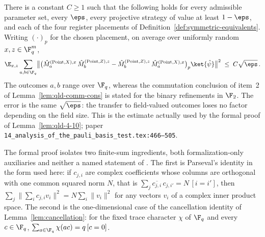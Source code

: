 \begin{lemma}
	\label{lem:expanded-point-field-commutation}
	\leanok
	There is a constant $C \geq 1$ such that the following holds for every
	admissible parameter set, every $\eps$, every projective strategy of value
	at least $1-\eps$, and each of the four register placements of
	Definition~\ref{def:symmetric-equivalents}. Writing $(\cdot)_p$ for the
	chosen placement, on average over uniformly random $x, z \in \F_q^m$,
	\[
		\E_{x,z} \sum_{a, b \in \F_q}
		\bigl\lVert
		\bigl(\hat{M}^{(\mathrm{Point},X),x}_{a}\,
		\hat{M}^{(\mathrm{Point},Z),z}_{b}
		- \hat{M}^{(\mathrm{Point},Z),z}_{b}\,
		\hat{M}^{(\mathrm{Point},X),x}_{a}\bigr)_{p}
		\ket{\hat{\psi}}
		\bigr\rVert^2
		\;\leq\; C\sqrt{\eps}\,.
	\]
	The outcomes $a, b$ range over $\F_q$, whereas the commutation conclusion
	of item~2 of Lemma~\ref{lem:qld-comm-cons} is stated for the binary
	refinements in $\F_2$. The error is the same $\sqrt{\eps}$: the transfer
	to field-valued outcomes loses no factor depending on the field size.
	This is the estimate actually used by the formal proof of
	Lemma~\ref{lem:qld-4-10}; paper
	\texttt{14\_analysis\_of\_the\_pauli\_basis\_test.tex:466--505}.

	The formal proof isolates two finite-sum ingredients, both
	formalization-only auxiliaries and neither a named statement of
	\cite{Ji2020MIPStar}. The first is Parseval's identity in the form used
	here: if $c_{j,i}$ are complex coefficients whose columns are orthogonal
	with one common squared norm $N$, that is
	$\sum_j \overline{c_{j,i}}\, c_{j,i'} = N \, [i = i']$, then
	$\sum_j \lVert \sum_i c_{j,i} v_i \rVert^2 = N \sum_i \lVert v_i \rVert^2$
	for any vectors $v_i$ of a complex inner product space. The second is the
	one-dimensional case of the cancellation identity of
	Lemma~\ref{lem:cancellation}: for the fixed trace character $\chi$ of
	$\F_q$ and every $c \in \F_q$,
	$\sum_{a \in \F_q} \chi(a c) = q \, [c = 0]$.
\end{lemma}
